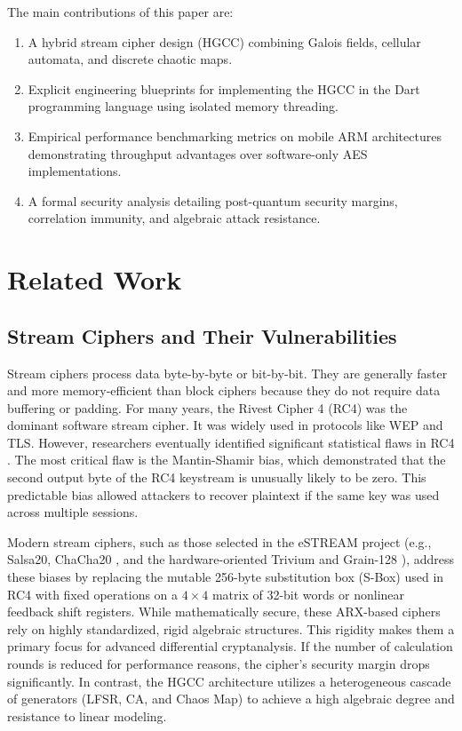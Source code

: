 \documentclass[runningheads]{llncs}
\begin{document}
The main contributions of this paper are:
\begin{enumerate}
    \item A hybrid stream cipher design (HGCC) combining Galois fields, cellular automata, and discrete chaotic maps.
    \item Explicit engineering blueprints for implementing the HGCC in the Dart programming language using isolated memory threading.
    \item Empirical performance benchmarking metrics on mobile ARM architectures demonstrating throughput advantages over software-only AES implementations.
    \item A formal security analysis detailing post-quantum security margins, correlation immunity, and algebraic attack resistance.
\end{enumerate}

\section{Related Work}

\subsection{Stream Ciphers and Their Vulnerabilities}
Stream ciphers process data byte-by-byte or bit-by-bit. They are generally faster and more memory-efficient than block ciphers because they do not require data buffering or padding. For many years, the Rivest Cipher 4 (RC4) was the dominant software stream cipher. It was widely used in protocols like WEP and TLS. However, researchers eventually identified significant statistical flaws in RC4 \cite{mironov2002}. The most critical flaw is the Mantin-Shamir bias, which demonstrated that the second output byte of the RC4 keystream is unusually likely to be zero. This predictable bias allowed attackers to recover plaintext if the same key was used across multiple sessions.

Modern stream ciphers, such as those selected in the eSTREAM project (e.g., Salsa20, ChaCha20 \cite{bernstein2008}, and the hardware-oriented Trivium and Grain-128 \cite{rueppel1986}), address these biases by replacing the mutable 256-byte substitution box (S-Box) used in RC4 with fixed operations on a $4\times4$ matrix of 32-bit words or nonlinear feedback shift registers. While mathematically secure, these ARX-based ciphers rely on highly standardized, rigid algebraic structures. This rigidity makes them a primary focus for advanced differential cryptanalysis. If the number of calculation rounds is reduced for performance reasons, the cipher's security margin drops significantly. In contrast, the HGCC architecture utilizes a heterogeneous cascade of generators (LFSR, CA, and Chaos Map) to achieve a high algebraic degree and resistance to linear modeling.
\end{document}
